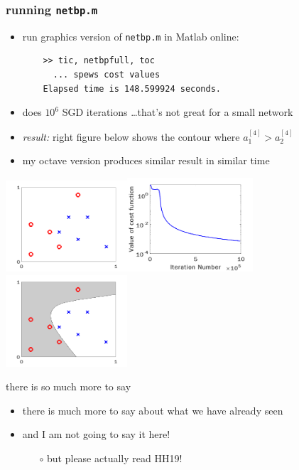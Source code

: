 \documentclass[xcolor={svgnames},
               hyperref={colorlinks,citecolor=DeepPink4,linkcolor=FireBrick,urlcolor=Maroon}]
               {beamer}
\begin{document}
\begin{frame}[fragile]
\frametitle{running \texttt{netbp.m}}

\begin{itemize}
\item run graphics version of \texttt{netbp.m} in Matlab online:

\begin{Verbatim}
    >> tic, netbpfull, toc
      ... spews cost values
    Elapsed time is 148.599924 seconds.
\end{Verbatim}

\item does $10^6$ SGD iterations \dots that's not great for a small network
\item \emph{result:} right figure below shows the contour where $a_1^{[4]} > a_2^{[4]}$
\item my octave version produces similar result in similar time
\end{itemize}

\bigskip
\mbox{\includegraphics[width=0.34\textwidth]{figs/fig1netbp}\includegraphics[width=0.35\textwidth]{figs/fig2netbp}\includegraphics[width=0.34\textwidth]{figs/fig3netbp}}
\end{frame}


\begin{frame}{there is so much more to say}

\begin{itemize}
\item there is much more to say about what we have already seen
\item and I am not going to say it here!
    \begin{itemize}
    \item[$\circ$] but please actually read HH19!
    \end{itemize}
\end{itemize}
\end{frame}
\end{document}
